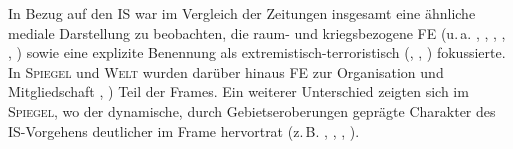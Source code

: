 In Bezug auf den IS war im Vergleich der Zeitungen insgesamt eine ähnliche mediale Darstellung zu beobachten, die raum- und kriegsbezogene FE (u.\,a. , , , , , ) sowie eine explizite Benennung als extremistisch-terroristisch (, , ) fokussierte. In \textsc{Spiegel} und \textsc{Welt} wurden darüber hinaus FE zur Organisation und Mitgliedschaft , ) Teil der Frames. Ein weiterer Unterschied zeigten sich im \textsc{Spiegel}, wo der dynamische, durch Gebietseroberungen geprägte Charakter des IS-Vorgehens deutlicher im Frame hervortrat (z.\,B. , , , ).
